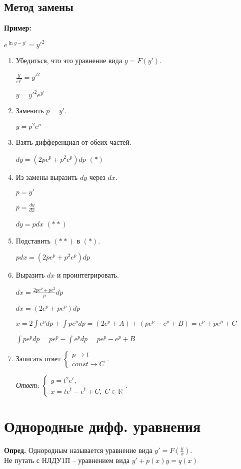 \documentclass[10pt, a4paper]{article}
\begin{document}
\subsection{Метод замены}
\textbf{Пример:}
\par $e^{\ln{y} - y'} = y'^2$
\begin{enumerate}
    \item Убедиться, что это уравнение вида $y = F(y')$.
        \par $\frac{y}{e^{y'}} = y'^2$
        \par $y = y'^2e^{y'}$
    \item Заменить $p = y'$.
        \par $y = p^2e^p$
    \item Взять дифференциал от обеих частей.
        \par $dy = (2pe^p + p^2e^p)dp$ $(*)$
    \item Из замены выразить $dy$ через $dx$.
        \par $p = y'$
        \par $p = \frac{dy}{dx}$
        \par $dy = pdx$ $(**)$
    \item Подставить $(**)$ в $(*)$.
        \par $pdx = (2pe^p + p^2e^p)dp$
    \item Выразить $dx$ и проинтегрировать.
        \par $dx = \frac{2pe^p + pe^2}{p}dp$
        \par $dx = (2e^p + pe^p)dp$
        \par $x = 2\int{e^pdp} + \int{pe^pdp} = (2e^p + A) + (pe^p - e^p + B) = e^p + pe^p + C$
        \par $\int{pe^pdp} = pe^p - \int{e^pdp} = pe^p - e^p + B$
    \item Записать ответ
        $\begin{cases}
            p \rightarrow t \\
            const \rightarrow C
        \end{cases}$.
        \par\textit{Ответ:}
        $\begin{cases}
            y = t^2e^t, \\
            x = te^t - e^t + C, \; C \in \mathbb{R}
        \end{cases}$.
\end{enumerate}


\section{Однородные дифф. уравнения}
\textbf{Опред.} Однородным называется уравнение вида $y' = F(\frac{y}{x})$. \\
Не путать с НЛДУ1П -- уравнением вида $y' + p(x)y = q(x)$
\end{document}
